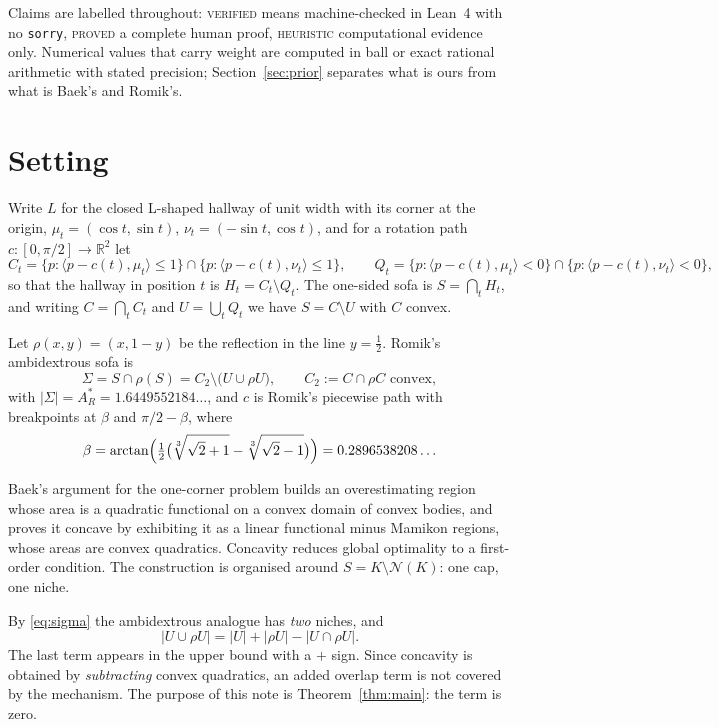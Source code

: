 \documentclass[11pt]{article}
\theoremstyle{definition}
\newcommand{\R}{\mathbb{R}}
\newcommand{\Sig}{\Sigma}
\DeclareMathOperator{\arctanop}{arctan}
\begin{document}
Claims are labelled throughout: \textsc{verified} means machine-checked in Lean~4 with no
\texttt{sorry}, \textsc{proved} a complete human proof, \textsc{heuristic} computational
evidence only. Numerical values that carry weight are computed in ball or exact rational
arithmetic with stated precision; Section~\ref{sec:prior} separates what is ours from what
is Baek's and Romik's.

\section{Setting}

Write $L$ for the closed L-shaped hallway of unit width with its corner at the
origin, $\mu_t=(\cos t,\sin t)$, $\nu_t=(-\sin t,\cos t)$, and for a rotation
path $c:[0,\pi/2]\to\R^2$ let
\[
  C_t=\{p:\langle p-c(t),\mu_t\rangle\le 1\}\cap\{p:\langle p-c(t),\nu_t\rangle\le 1\},
  \qquad
  Q_t=\{p:\langle p-c(t),\mu_t\rangle<0\}\cap\{p:\langle p-c(t),\nu_t\rangle<0\},
\]
so that the hallway in position $t$ is $H_t=C_t\setminus Q_t$. The one-sided
sofa is $S=\bigcap_t H_t$, and writing $C=\bigcap_t C_t$ and
$U=\bigcup_t Q_t$ we have $S=C\setminus U$ with $C$ convex.

Let $\rho(x,y)=(x,1-y)$ be the reflection in the line $y=\tfrac12$. Romik's
ambidextrous sofa is
\begin{equation}\label{eq:sigma}
  \Sig=S\cap\rho(S)=C_2\setminus\bigl(U\cup\rho U\bigr),
  \qquad C_2:=C\cap\rho C \text{ convex},
\end{equation}
with $|\Sig|=A_R^\ast=1.6449552184\ldots$, and $c$ is Romik's piecewise path with
breakpoints at $\beta$ and $\pi/2-\beta$, where
\begin{equation}\label{eq:beta}
  \beta=\arctanop\Bigl(\tfrac12\bigl(\sqrt[3]{\sqrt2+1}-\sqrt[3]{\sqrt2-1}\bigr)\Bigr)
      =0.2896538208\ldots
\end{equation}

Baek's argument for the one-corner problem builds an overestimating region whose
area is a quadratic functional on a convex domain of convex bodies, and proves it
concave by exhibiting it as a linear functional minus Mamikon regions, whose areas
are convex quadratics. Concavity reduces global optimality to a first-order
condition. The construction is organised around $S=K\setminus\mathcal N(K)$: one
cap, one niche.

By \eqref{eq:sigma} the ambidextrous analogue has \emph{two} niches, and
\begin{equation}\label{eq:ie}
  |U\cup\rho U|=|U|+|\rho U|-|U\cap\rho U|.
\end{equation}
The last term appears in the upper bound with a $+$ sign. Since concavity is
obtained by \emph{subtracting} convex quadratics, an added overlap term is not
covered by the mechanism. The purpose of this note is Theorem~\ref{thm:main}:
the term is zero.
\end{document}
